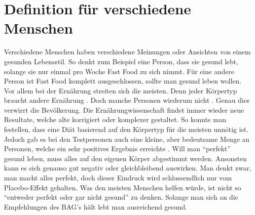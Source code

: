 \section{Definition für verschiedene Menschen}
\authortoc{\jonas}{\sectionident}
Verschiedene Menschen haben verschiedene Meinungen oder Ansichten von einem gesunden Lebensstil. So denkt zum Beispiel eine Person, dass sie gesund lebt, solange sie nur einmal pro Woche Fast Food zu sich nimmt. Für eine andere Person ist Fast Food komplett ausgeschlossen, sollte man gesund leben wollen. Vor allem bei der Ernährung streiten sich die meisten. Denn jeder Körpertyp braucht andere Ernährung \cite{all-about-body-type-eating}. Doch manche Personen wiederum nicht \cite{all-about-body-type-eating}. Genau dies verwirrt die Bevölkerung.
\newline
Die Ernährungwissenschaft findet immer wieder neue Resultate, welche alte korrigiert oder komplexer gestaltet. So konnte man festellen, dass eine Diät basierend auf den Körpertyp für die meisten unnötig ist. Jedoch gab es bei den Testpersonen auch eine kleine, aber bedeutsame Menge an Personen, welche ein sehr positives Ergebnis erreichte \cite{all-about-body-type-eating}.
\newline
\newline
Will man “perfekt” gesund leben, muss alles auf den eigenen Körper abgestimmt werden. Ansonsten kann es sich genauso gut negativ oder gleichbleibend auswirken. Man denkt zwar, man macht alles perfekt, doch dieser Eindruck wird schlussendlich nur vom Placebo-Effekt gehalten.
\newline
\newline
Was den meisten Menschen helfen würde, ist nicht so “entweder perfekt oder gar nicht gesund” zu denken. Solange man sich an die Empfehlungen des BAG's hält lebt man ausreichend gesund.

